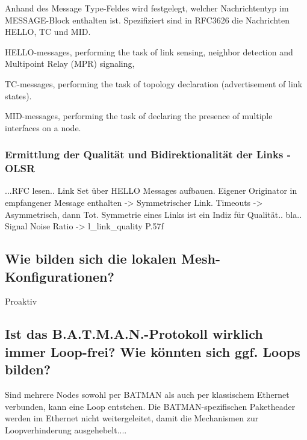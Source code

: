 \documentclass[a4paper,10pt]{article}
\begin{document}
Anhand des Message Type-Feldes wird festgelegt, welcher Nachrichtentyp im MESSAGE-Block enthalten ist. Spezifiziert sind in RFC3626 die Nachrichten HELLO, TC und MID.

HELLO-messages, performing the task of link sensing, neighbor detection and Multipoint Relay (MPR) signaling,



TC-messages, performing the task of topology declaration (advertisement of link states).

MID-messages, performing the task of declaring the presence of multiple interfaces on a node.

\subsubsection*{Ermittlung der Qualität und Bidirektionalität der Links - OLSR}
...RFC lesen..
Link Set über HELLO Messages aufbauen. Eigener Originator in empfangener Message enthalten -> Symmetrischer Link. Timeouts -> Asymmetrisch, dann Tot.
Symmetrie eines Links ist ein Indiz für Qualität.. bla..
Signal Noise Ratio -> l_link_quality P.57f

\subsection{Wie bilden sich die lokalen Mesh-Konfigurationen?}

Proaktiv

\subsection{Ist das B.A.T.M.A.N.-Protokoll wirklich immer Loop-frei? Wie könnten sich ggf. Loops bilden?}
Sind mehrere Nodes sowohl per BATMAN als auch per klassischem Ethernet verbunden, kann eine Loop entstehen. Die BATMAN-spezifischen Paketheader werden im Ethernet nicht weitergeleitet, damit die Mechanismen zur Loopverhinderung ausgehebelt....
\end{document}
